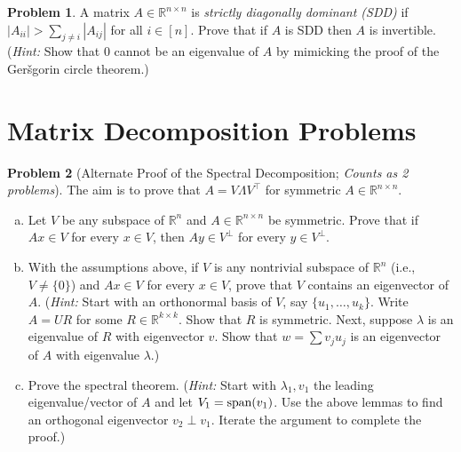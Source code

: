 \documentclass{amsart}[11pt]
\theoremstyle{definition}
\newtheorem{problem}{Problem}
\newcommand{\R}{\mathbb{R}}
\newcommand{\sspan}{\textnormal{span}}
\begin{document}
\begin{problem}
A matrix $A\in\R^{n\times n}$ is \textit{strictly diagonally dominant (SDD)} if $|A_{ii}|>\sum_{j\neq i}|A_{ij}|$ for all $i\in[n]$. Prove that if $A$ is SDD then $A$ is invertible. (\textit{Hint:} Show that $0$ cannot be an eigenvalue of $A$ by mimicking the proof of the Ger\v{s}gorin circle theorem.)
\end{problem}

\section{Matrix Decomposition Problems}

\begin{problem}[Alternate Proof of the Spectral Decomposition; \textit{Counts as 2 problems}]
The aim is to prove that $A = V\Lambda V^\top$ for symmetric $A\in\R^{n\times n}$.
\begin{enumerate}[(a)]
\item Let $V$ be any subspace of $\R^n$ and $A\in\R^{n\times n}$ be symmetric. Prove that if $Ax\in V$ for every $x\in V$, then $Ay\in V^\perp$ for every $y\in V^\perp$.
\item With the assumptions above, if $V$ is any nontrivial subspace of $\R^n$ (i.e., $V\neq \{0\}$) and $Ax\in V$ for every $x\in V$, prove that $V$ contains an eigenvector of $A$. (\textit{Hint:} Start with an orthonormal basis of $V$, say $\{u_1,\dots,u_k\}$. Write $A = UR$ for some $R\in\R^{k\times k}$. Show that $R$ is symmetric. Next, suppose $\lambda$ is an eigenvalue of $R$ with eigenvector $v$. Show that $w  = \sum v_ju_j$ is an eigenvector of $A$ with eigenvalue $\lambda$.)
\item Prove the spectral theorem. (\textit{Hint:} Start with $\lambda_1, v_1$ the leading eigenvalue/vector of $A$ and let $V_1 = \sspan(v_1)$. Use the above lemmas to find an orthogonal eigenvector $v_2\perp v_1$. Iterate the argument to complete the proof.)
\end{enumerate}
\end{problem}
\end{document}
